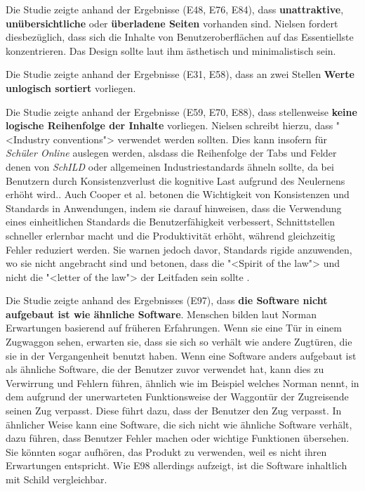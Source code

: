 Die Studie zeigte anhand der Ergebnisse (E48, E76, E84), dass \textbf{unattraktive}, \textbf{unübersichtliche} oder \textbf{überladene Seiten} vorhanden sind. Nielsen fordert diesbezüglich, dass sich die Inhalte von Benutzeroberflächen auf das Essentiellste konzentrieren. Das Design sollte laut ihm ästhetisch und minimalistisch sein. \cite{Nielsen10}

Die Studie zeigte anhand der Ergebnisse (E31, E58), dass an zwei Stellen \textbf{Werte unlogisch sortiert} vorliegen.

Die Studie zeigte anhand der Ergebnisse (E59, E70, E88), dass stellenweise \textbf{keine logische Reihenfolge der Inhalte} vorliegen. Nielsen schreibt hierzu, dass "<Industry conventions"> verwendet werden sollten.\cite{Nielsen10} Dies kann insofern für \textit{Schüler Online} auslegen werden, alsdass die Reihenfolge der Tabs und Felder denen von \textit{SchILD} oder allgemeinen Industriestandards ähneln sollte, da bei Benutzern durch Konsistenzverlust die kognitive Last aufgrund des Neulernens erhöht wird.\cite{Nielsen10}. Auch Cooper et al. betonen die Wichtigkeit von Konsistenzen und Standards in Anwendungen, indem sie darauf hinweisen, dass die Verwendung eines einheitlichen Standards die Benutzerfähigkeit verbessert, Schnittstellen schneller erlernbar macht und die Produktivität erhöht, während gleichzeitig Fehler reduziert werden. Sie warnen jedoch davor, Standards rigide anzuwenden, wo sie nicht angebracht sind und betonen, dass die "<Spirit of the law"> und nicht die "<letter of the law"> der Leitfaden sein sollte \cite{CooperReimannEtAl14}.

Die Studie zeigte anhand des Ergebnisses (E97), dass \textbf{die Software nicht aufgebaut ist wie ähnliche Software}. Menschen bilden laut Norman Erwartungen basierend auf früheren Erfahrungen. Wenn sie eine Tür in einem Zugwaggon sehen, erwarten sie, dass sie sich so verhält wie andere Zugtüren, die sie in der Vergangenheit benutzt haben. Wenn eine Software anders aufgebaut ist als ähnliche Software, die der Benutzer zuvor verwendet hat, kann dies zu Verwirrung und Fehlern führen, ähnlich wie im Beispiel welches Norman nennt, in dem aufgrund der unerwarteten Funktionsweise der Waggontür der Zugreisende seinen Zug verpasst. Diese führt dazu, dass der Benutzer den Zug verpasst.\cite{Norman} In ähnlicher Weise kann eine Software, die sich nicht wie ähnliche Software verhält, dazu führen, dass Benutzer Fehler machen oder wichtige Funktionen übersehen. Sie könnten sogar aufhören, das Produkt zu verwenden, weil es nicht ihren Erwartungen entspricht. Wie E98 allerdings aufzeigt, ist die Software inhaltlich mit Schild vergleichbar.

